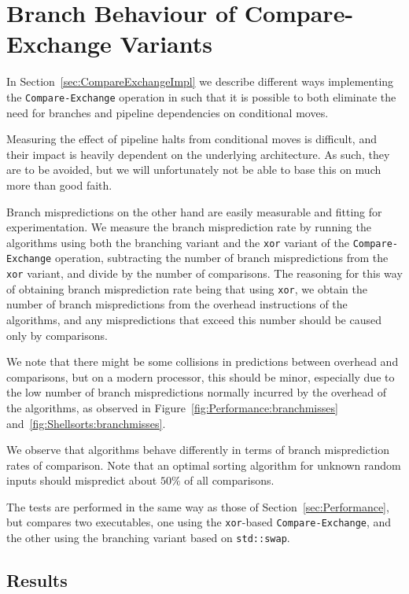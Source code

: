 \FloatBarrier
\section{Branch Behaviour of Compare-Exchange Variants} \FloatBarrier
\label{sec:CEBranchExperiment}


In Section~\ref{sec:CompareExchangeImpl} we describe different ways implementing the \texttt{Compare-Exchange} operation in such that it is possible to both eliminate the need for branches and pipeline dependencies on conditional moves.

Measuring the effect of pipeline halts from conditional moves is difficult, and their impact is heavily dependent on the underlying architecture. As such, they are to be avoided, but we will unfortunately not be able to base this on much more than good faith.

Branch mispredictions on the other hand are easily measurable and fitting for experimentation.
We measure the branch misprediction rate by running the algorithms using both the branching variant and the \texttt{xor} variant of the \texttt{Compare-Exchange} operation, subtracting the number of branch mispredictions from the \texttt{xor} variant, and divide by the number of comparisons. The reasoning for this way of obtaining branch misprediction rate being that using \texttt{xor}, we obtain the number of branch mispredictions from the overhead instructions of the algorithms, and any mispredictions that exceed this number should be caused only by comparisons.

We note that there might be some collisions in predictions between overhead and comparisons, but on a modern processor, this should be minor, especially due to the low number of branch mispredictions normally incurred by the overhead of the algorithms, as observed in Figure~\ref{fig:Performance:branchmisses} and~\ref{fig:Shellsorts:branchmisses}. 

We observe that algorithms behave differently in terms of branch misprediction rates of comparison. Note that an optimal sorting algorithm for unknown random inputs should mispredict about $50\%$ of all comparisons.

The tests are performed in the same way as those of Section~\ref{sec:Performance}, but compares two executables, one using the \texttt{xor}-based \texttt{Compare-Exchange}, and the other using the branching variant based on \texttt{std::swap}.

\subsection{Results}

